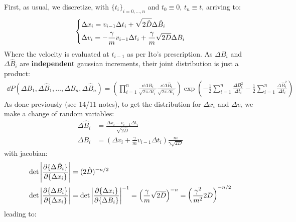 \documentclass[../template.tex]{subfiles}
\begin{document}
First, as usual, we discretize, with $\{t_i\}_{i=0,\dots,n}$ and $t_0 \equiv 0$, $t_n \equiv t$, arriving to:
\begin{align*}
    \begin{dcases}
        \Delta x_i = v_{i-1} \Delta t_i + \sqrt{2 \hat{D}} \Delta \hat{B}_i\\
        \Delta v_i = - \frac{\gamma}{m} v_{i-1} \Delta t_i + \frac{\gamma}{m} \sqrt{2 D} \Delta B_i  
    \end{dcases}
\end{align*}
Where the velocity is evaluated at $t_{i-1}$ as per Ito's prescription. As $\Delta B_i$ and $\Delta \hat{B}_i$ are \textbf{independent} gaussian increments, their joint distribution is just a product:
\begin{align*}
    \dd{P} (\Delta B_1, \Delta \hat{B}_1, \dots, \Delta B_n, \Delta \hat{B}_n) = \left( \prod_{i=1}^n \frac{\dd{\Delta B}_i}{\sqrt{2 \pi  \Delta t_i}} \frac{\dd{\Delta \hat{B}_i}}{\sqrt{2 \pi \Delta t_i}} \right) \exp\left(-\frac{1}{2} \sum_{i=1}^n \frac{\Delta B_i^2}{\Delta t_i}  - \frac{1}{2} \sum_{i=1}^n \frac{\Delta \hat{B}_i^2}{\Delta t_i}    \right)  
\end{align*}
As done previously (see 14/11 notes), to get the distribution for $\Delta x_i$ and $\Delta v_i$ we make a change of random variables:
\begin{align*}
    \Delta \hat{B}_i &= \frac{\Delta x_i - v_{i-1} \Delta t_i}{\sqrt{2 \hat{D}}} \\
    \Delta B_i &= \left(\Delta v_i + \frac{\gamma}{m} v_{i-1} \Delta t_i \right) \frac{m}{\gamma \sqrt{2D}} 
\end{align*}
with jacobian:
\begin{align*}
    \operatorname{det}\left|\pdv{\{\Delta \hat{B}_i\}}{\{\Delta x_i\}}\right| &=(2 \hat{D})^{-n/2}\\ \operatorname{det}\left|\pdv{\{\Delta B_i\}}{\{\Delta x_i\}}\right| &= \operatorname{det}\left|\pdv{\{\Delta x_i\}}{\{\Delta B_i\}}\right|^{-1} = \left(\frac{\gamma}{m} \sqrt{2D} \right)^{-n} = \left(\frac{\gamma^2}{m^2} 2 D \right)^{-n/2}
\end{align*}
leading to:
\end{document}
